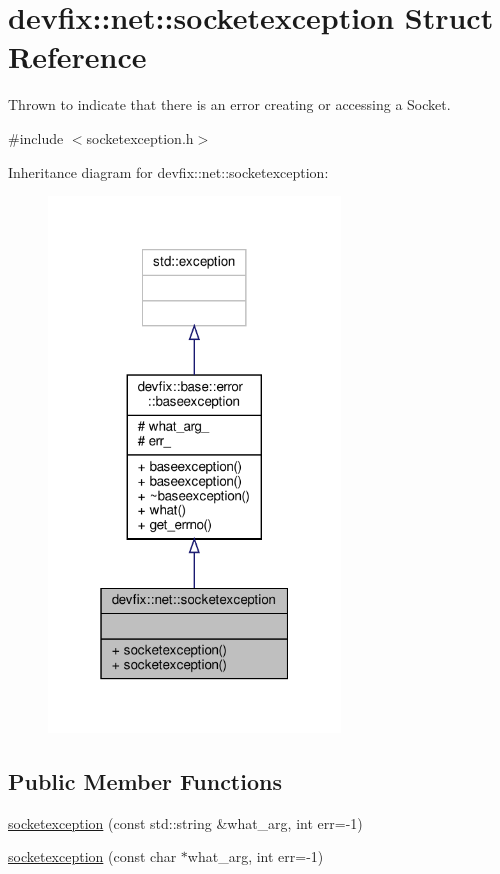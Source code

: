 \hypertarget{structdevfix_1_1net_1_1socketexception}{}\section{devfix\+:\+:net\+:\+:socketexception Struct Reference}
\label{structdevfix_1_1net_1_1socketexception}


Thrown to indicate that there is an error creating or accessing a Socket.  




{\ttfamily \#include $<$socketexception.\+h$>$}



Inheritance diagram for devfix\+:\+:net\+:\+:socketexception\+:\nopagebreak
\begin{figure}[H]
\begin{center}
\leavevmode
\includegraphics[width=220pt]{structdevfix_1_1net_1_1socketexception__inherit__graph}
\end{center}
\end{figure}
\subsection*{Public Member Functions}
\begin{DoxyCompactItemize}
\item 
\hyperlink{structdevfix_1_1net_1_1socketexception_aeab5d004d494103b37156a5f23a5296a}{socketexception} (const std\+::string \&what\+\_\+arg, int err=-\/1)
\item 
\hyperlink{structdevfix_1_1net_1_1socketexception_a6da69f635eb11f932a0e960545d023bd}{socketexception} (const char $\ast$what\+\_\+arg, int err=-\/1)
\end{DoxyCompactItemize}
